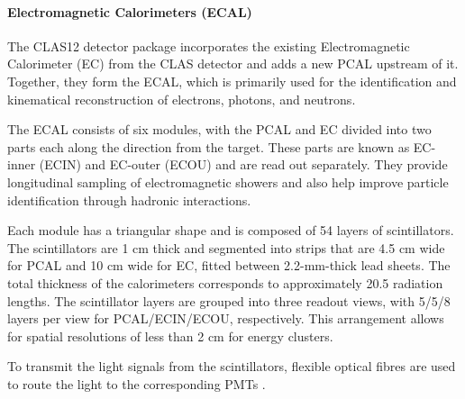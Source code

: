 \paragraph{Electromagnetic Calorimeters (ECAL)}
    The CLAS12 detector package incorporates the existing Electromagnetic Calorimeter (EC) from the CLAS detector and adds a new PCAL upstream of it.
    Together, they form the ECAL, which is primarily used for the identification and kinematical reconstruction of electrons, photons, and neutrons.

    The ECAL consists of six modules, with the PCAL and EC divided into two parts each along the direction from the target.
    These parts are known as EC-inner (ECIN) and EC-outer (ECOU) and are read out separately.
    They provide longitudinal sampling of electromagnetic showers and also help improve particle identification through hadronic interactions.

    Each module has a triangular shape and is composed of 54 layers of scintillators.
    The scintillators are 1 cm thick and segmented into strips that are 4.5 cm wide for PCAL and 10 cm wide for EC, fitted between 2.2-mm-thick lead sheets.
    The total thickness of the calorimeters corresponds to approximately 20.5 radiation lengths.
    The scintillator layers are grouped into three readout views, with 5/5/8 layers per view for PCAL/ECIN/ECOU, respectively.
    This arrangement allows for spatial resolutions of less than 2 cm for energy clusters.

    To transmit the light signals from the scintillators, flexible optical fibres are used to route the light to the corresponding PMTs \cite{asryan2020}.
